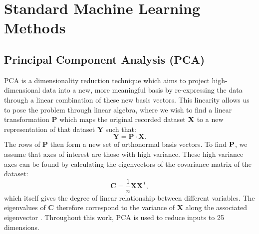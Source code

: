 \section{Standard Machine Learning Methods}
\label{appendix:ML_methods}
\subsection{Principal Component Analysis (PCA)}
\label{sec:methods:pca}
PCA \cite{wold_principal_nodate} is a dimensionality reduction technique which aims to project high-dimensional data into a new, more meaningful basis by re-expressing the data through a linear combination of these new basis vectors. This linearity allows us to pose the problem through linear algebra, where we wish to find a linear transformation $\boldsymbol{P}$ which maps the original recorded dataset $\bf X$ to a new representation of that dataset $\boldsymbol{Y}$ such that:
\begin{equation}
    \boldsymbol{Y} = \boldsymbol{P} \cdot \boldsymbol{X}.
\end{equation}
The rows of $\boldsymbol{P}$ then form a new set of orthonormal basis vectors. To find $\bf P$, we assume that axes of interest are those with high variance. These high variance axes can be found by calculating the eigenvectors of the covariance matrix of the dataset: 
\begin{equation}
    \boldsymbol{C} = \frac{1}{n} \boldsymbol{X} \boldsymbol{X}^T,
\end{equation}
which itself gives the degree of linear relationship between different variables. The eigenvalues of $\boldsymbol{C}$ therefore correspond to the variance of $\boldsymbol{X}$ along the associated eigenvector \cite{shlens_tutorial_2014}. Throughout this work, PCA is used to reduce inputs to 25 dimensions.


